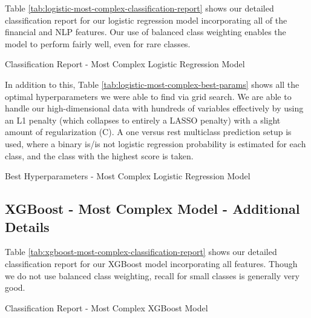 \documentclass{article}[11pt]
\begin{document}
    Table \ref{tab:logistic-most-complex-classification-report} shows our detailed classification report for our logistic regression model incorporating all of the financial and NLP features. Our use of balanced class weighting enables the model to perform fairly well, even for rare classes.

    \begin{table}[h!]
        \centering
        \caption{Classification Report - Most Complex Logistic Regression Model}
        
        \label{tab:logistic-most-complex-classification-report}
    \end{table}

    In addition to this, Table \ref{tab:logistic-most-complex-best-params} shows all the optimal hyperparameters we were able to find via grid search. We are able to handle our high-dimensional data with hundreds of variables effectively by using an L1 penalty (which collapses to entirely a LASSO penalty) with a slight amount of regularization (C). A one versus rest multiclass prediction setup is used, where a binary is/is not logistic regression probability is estimated for each class, and the class with the highest score is taken.

    \begin{table}[h!]
        \centering
        \caption{Best Hyperparameters - Most Complex Logistic Regression Model}
        
        \label{tab:logistic-most-complex-best-params}
    \end{table}

    \clearpage
    \newpage

    \subsection{XGBoost - Most Complex Model - Additional Details}

    \label{sec:xgboost-most-complex-model-additional-details}

    Table \ref{tab:xgboost-most-complex-classification-report} shows our detailed classification report for our XGBoost model incorporating all features. Though we do not use balanced class weighting, recall for small classes is generally very good.

    \begin{table}[h!]
        \centering
        \caption{Classification Report - Most Complex XGBoost Model}
        
        \label{tab:xgboost-most-complex-classification-report}
    \end{table}
\end{document}
